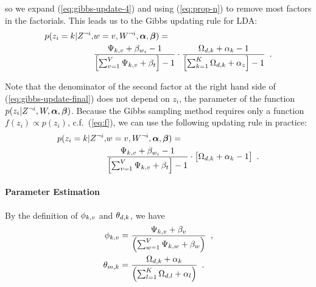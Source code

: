 so we expand (\ref{eq:gibbs-update-4}) and using (\ref{eq:prop-n}) to
remove most factors in the factorials.  This leads us to the Gibbs
updating rule for LDA:
\begin{equation}
  \label{eq:gibbs-update-5}
  \begin{split}
    p(z_i=k|Z^{\neg i},&w=v,W^{\neg i},\boldsymbol{\alpha},\boldsymbol{\beta})
    =
    \\
    & \frac{
      \Psi_{k,v} + \beta_{w_i} - 1
    }{
      \left[ \sum_{v=1}^{V}  \Psi_{k,v} + \beta_{t} \right] - 1
    }
    \cdot
    \frac{
      \Omega_{d,k} + \alpha_{k} - 1
    }{
      \left[ \sum_{k=1}^{K}  \Omega_{d,k} + \alpha_{z} \right] - 1
    }
    \enspace.
  \end{split}
\end{equation}

Note that the denominator of the second factor at the right hand side
of (\ref{eq:gibbs-update-final}) does not depend on $z_i$, the
parameter of the function
$p(z_i|Z^{\neg i},W,\boldsymbol{\alpha},\boldsymbol{\beta})$.  Because the
Gibbs sampling method requires only a function
$f(z_i)\propto{}p(z_i)$, c.f.~(\ref{eq:f}), we can use the following
updating rule in practice:
\begin{equation}
  \label{eq:gibbs-update-final}
  \begin{split}
    p(z_i=k|Z^{\neg i},&w=v,W^{\neg i},\boldsymbol{\alpha},\boldsymbol{\beta})
    =
    \\
    & \frac{
      \Psi_{k,v} + \beta_{w_i} - 1
    }{
      \left[ \sum_{v=1}^{V}  \Psi_{k,v} + \beta_{t} \right] - 1
    }
    \cdot
    \big[
      \Omega_{d,k} + \alpha_{k} - 1
    \big]
    \enspace.
  \end{split}
\end{equation}


\paragraph{Parameter Estimation}

By the definition of $\phi_{k,v}$ and $\theta_{d,k}$, we have
\begin{equation}
  \label{eq:read-out-final}
  \begin{split}
  \phi_{k,v}
  &=
  \frac{
    \Psi_{k,v} + \beta_{v}
  }{
    \left( \sum_{w=1}^{V}  \Psi_{k,w} + \beta_{w} \right)
  }
  \enspace,
  \\
  \theta_{m,k}
  &=
  \frac{
    \Omega_{d,k} + \alpha_{k}
  }{
    \left( \sum_{l=1}^{K}  \Omega_{d,l} + \alpha_{l} \right)
  }
  \enspace.
  \end{split}
\end{equation}


